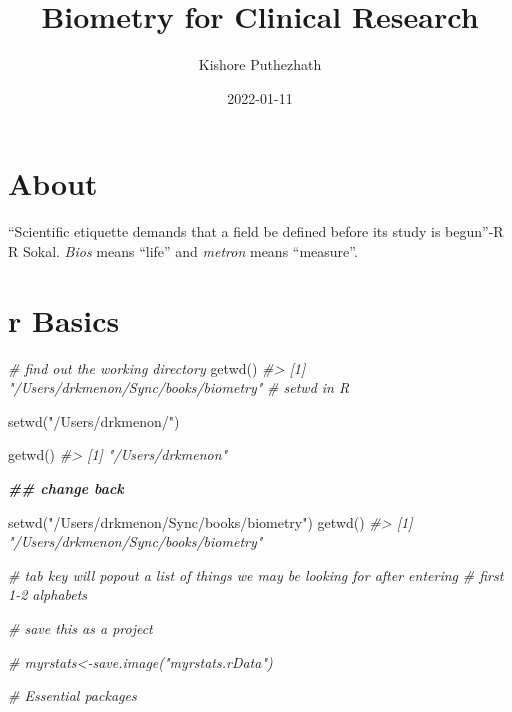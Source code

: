 \documentclass[
]{book}
\title{Biometry for Clinical Research}
\author{Kishore Puthezhath}
\date{2022-01-11}
\newenvironment{Shaded}{\begin{snugshade}}{\end{snugshade}}
\newcommand{\CommentTok}[1]{\textcolor[rgb]{0.56,0.35,0.01}{\textit{#1}}}
\newcommand{\DocumentationTok}[1]{\textcolor[rgb]{0.56,0.35,0.01}{\textbf{\textit{#1}}}}
\newcommand{\FunctionTok}[1]{\textcolor[rgb]{0.00,0.00,0.00}{#1}}
\newcommand{\NormalTok}[1]{#1}
\newcommand{\StringTok}[1]{\textcolor[rgb]{0.31,0.60,0.02}{#1}}
\begin{document}
\maketitle

{
\setcounter{tocdepth}{1}
\tableofcontents
}
\hypertarget{about}{%
\chapter{About}\label{about}}

``Scientific etiquette demands that a field be defined before its study is begun''-R R Sokal. \emph{Bios} means ``life'' and \emph{metron} means ``measure''.

\hypertarget{r-basics}{%
\chapter{r Basics}\label{r-basics}}

\begin{Shaded}
\begin{Highlighting}[]
\CommentTok{\# find out the working directory}
\FunctionTok{getwd}\NormalTok{()}
\CommentTok{\#\textgreater{} [1] "/Users/drkmenon/Sync/books/biometry"}
\CommentTok{\# setwd in R}

\FunctionTok{setwd}\NormalTok{(}\StringTok{"/Users/drkmenon/"}\NormalTok{)}

\FunctionTok{getwd}\NormalTok{()}
\CommentTok{\#\textgreater{} [1] "/Users/drkmenon"}

\DocumentationTok{\#\# change back}
\end{Highlighting}
\end{Shaded}

\begin{Shaded}
\begin{Highlighting}[]
\FunctionTok{setwd}\NormalTok{(}\StringTok{"/Users/drkmenon/Sync/books/biometry"}\NormalTok{)}
\FunctionTok{getwd}\NormalTok{()}
\CommentTok{\#\textgreater{} [1] "/Users/drkmenon/Sync/books/biometry"}

\CommentTok{\# tab key will popout a list of things we may be looking for after entering }
\CommentTok{\# first 1{-}2 alphabets}

\CommentTok{\# save this as a project}

\CommentTok{\# myrstats\textless{}{-}save.image("myrstats.rData")}

\CommentTok{\# Essential packages}
\end{Highlighting}
\end{Shaded}
\end{document}
